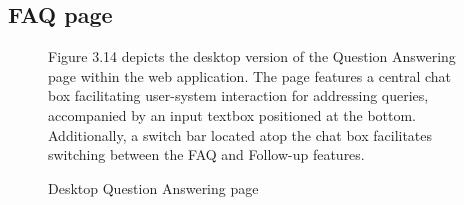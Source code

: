 \documentclass[12pt,oneside,openright,a4paper]{cpe-english-project}
\begin{document}
    \subsection{FAQ page}
    \begin{figure}[!h]
      \centering
      \caption{Desktop Question Answering page}\label{fig:Desk_FAQ}
      \begin{flushleft}
        \qquad Figure 3.14 depicts the desktop version of the Question Answering page within the web application. The page features a central chat box facilitating user-system interaction for addressing queries, accompanied by an input textbox positioned at the bottom. Additionally, a switch bar located atop the chat box facilitates switching between the FAQ and Follow-up features. \par
      \end{flushleft}
    \end{figure}
\end{document}
